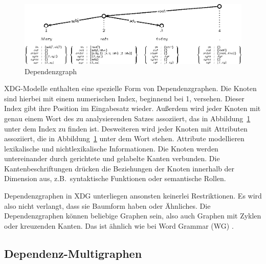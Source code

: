 \begin{figure}
\centering
\includegraphics[scale=1.0]{eps/syn1_xdag.eps}
\caption{Dependenzgraph}
\label{DG}
\end{figure}

XDG-Modelle enthalten eine spezielle Form von Dependenzgraphen. Die
Knoten sind hierbei mit einem numerischen Index, beginnend bei 1,
versehen. Dieser Index gibt ihre Position im Eingabesatz
wieder. Au{\ss}erdem wird jeder Knoten mit genau einem Wort des zu
analysierenden Satzes assoziiert, das in Abbildung~\ref{DG} unter dem
Index zu finden ist.  Desweiteren wird jeder Knoten mit Attributen
assoziiert, die in Abbildung~\ref{DG} unter dem Wort stehen. Attribute
modellieren lexikalische und nichtlexikalische Informationen. Die
Knoten werden untereinander durch gerichtete und gelabelte Kanten
verbunden. Die Kantenbeschriftungen dr\"ucken die Beziehungen der
Knoten innerhalb der Dimension aus, z.B.\ syntaktische Funktionen oder
semantische Rollen.

Dependenzgraphen in XDG unterliegen ansonsten keinerlei
Restriktionen. Es wird also nicht verlangt, dass sie Baumform haben
oder \"Ahnliches. Die Dependenzgraphen k\"onnen beliebige Graphen
sein, also auch Graphen mit Zyklen oder kreuzenden Kanten. Das ist
\"ahnlich wie bei Word Grammar (WG) \cite{Hudson90}.

\subsection{Dependenz-Multigraphen}

